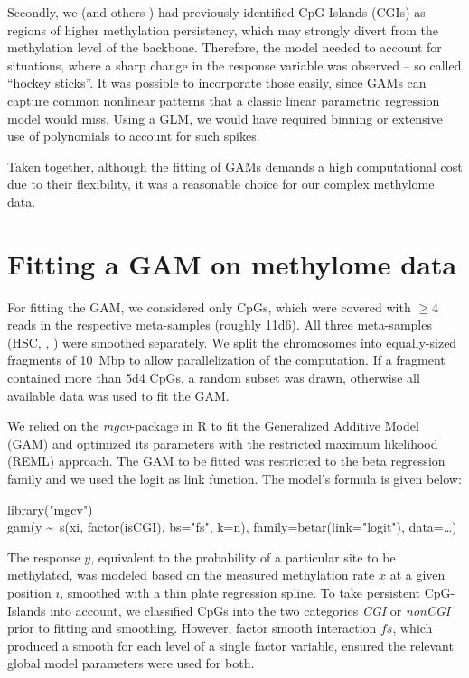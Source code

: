 Secondly, we (and others \cite{Lee2015}) had previously identified CpG-Islands (CGIs) as regions of higher methylation persistency, which may strongly divert from the methylation level of the backbone. Therefore, the model needed to account for situations, where a sharp change in the response variable was observed – so called \enquote{hockey sticks}. It was possible to incorporate those easily, since GAMs can capture common nonlinear patterns that a classic linear parametric regression model would miss. Using a GLM, we would have required binning or extensive use of polynomials to account for such spikes.

Taken together, although the fitting of GAMs demands a high computational cost due to their flexibility, it was a reasonable choice for our complex methylome data. 

\section{Fitting a GAM on methylome data}
\label{chap:r:gam:fitting}

For fitting the GAM, we considered only CpGs, which were covered with $\geq4$ reads in the respective meta-samples (roughly \num{11d6}). All three meta-samples (\dnmtwt HSC, \dnmtwt \kitpos, \dnmtchip \kitpos) were smoothed separately. We split the chromosomes into equally-sized fragments of \SI{10}{\mega bp} to allow parallelization of the computation. If a fragment contained more than \num{5d4} CpGs, a random subset was drawn, otherwise all available data was used to fit the GAM. 

We relied on the \emph{mgcv}-package \cite{wood2011fast} in R\cite{rproject} to fit the Generalized Additive Model (GAM) and optimized its parameters with the restricted maximum likelihood (REML) approach. The GAM to be fitted was restricted to the beta regression family and we used the logit as link function. The model's formula is given below:

 \begin{algorithm}[H]
 	\begin{algorithm2e}[H]
 library("mgcv") \\
 gam(y \textasciitilde \, s(xi, factor(isCGI), bs="fs", k=n), family=betar(link="logit"), data=\ldots) 
 \end{algorithm2e}
 \end{algorithm} 
The response $y$, equivalent to the probability of a particular site to be methylated, was modeled based on the measured methylation rate $x$ at a given position $i$, smoothed with a thin plate regression spline\cite{Wood2003}. To take persistent CpG-Islands into account, we classified CpGs into the two categories \emph{CGI} or \emph{nonCGI} prior to fitting and smoothing. However, factor smooth interaction $fs$, which produced a smooth for each level of a single factor variable, ensured the relevant global model parameters were used for both. 

